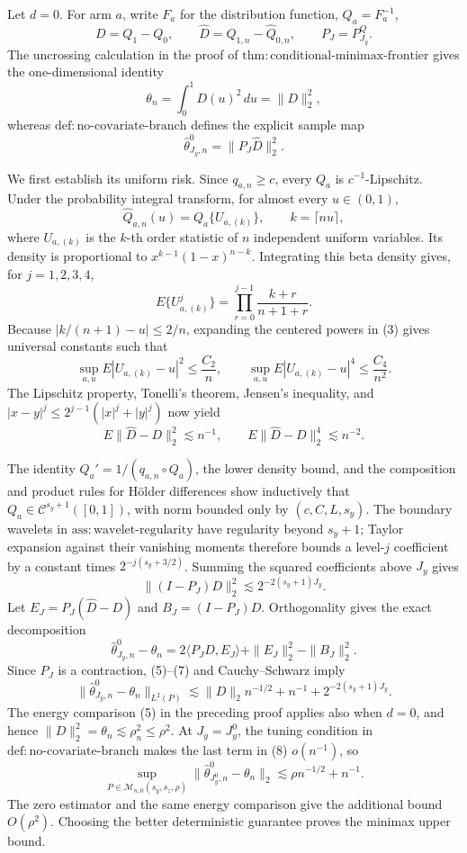 Let \(d=0\).  For arm \(a\), write \(F_a\) for the distribution function, \(Q_a=F_a^{-1}\),
\[
D=Q_1-Q_0,
\qquad
\widehat D=\widehat Q_{1,n}-\widehat Q_{0,n},
\qquad
P_J=P^Q_{J_y}.
\]
The uncrossing calculation in the proof of
\(\mathrm{thm{:}conditional\text{-}minimax\text{-}frontier}\) gives the one-dimensional identity
\[
\theta_n=\int_0^1D(u)^2\,du=\|D\|_2^2,                     \tag{1}
\]
whereas
\(\mathrm{def{:}no\text{-}covariate\text{-}branch}\) defines the explicit sample map
\[
\widehat\theta^0_{J_y,n}=\|P_J\widehat D\|_2^2.            \tag{2}
\]

We first establish its uniform risk.  Since \(q_{a,n}\ge c\), every \(Q_a\) is \(c^{-1}\)-Lipschitz.  Under the probability integral transform, for almost every \(u\in(0,1)\),
\[
\widehat Q_{a,n}(u)=Q_a\{U_{a,(k)}\},
\qquad k=\lceil nu\rceil,
\]
where \(U_{a,(k)}\) is the \(k\)-th order statistic of \(n\) independent uniform variables.  Its density is proportional to
\(x^{k-1}(1-x)^{n-k}\).  Integrating this beta density gives, for \(j=1,2,3,4\),
\[
E\{U_{a,(k)}^j\}
=\prod_{r=0}^{j-1}\frac{k+r}{n+1+r}.                       \tag{3}
\]
Because \(|k/(n+1)-u|\le2/n\), expanding the centered powers in (3) gives universal constants such that
\[
\sup_{a,u}E|U_{a,(k)}-u|^2\le\frac{C_2}{n},
\qquad
\sup_{a,u}E|U_{a,(k)}-u|^4\le\frac{C_4}{n^2}.              \tag{4}
\]
The Lipschitz property, Tonelli's theorem, Jensen's inequality, and
\(|x-y|^j\le2^{j-1}(|x|^j+|y|^j)\) now yield
\[
E\|\widehat D-D\|_2^2\lesssim n^{-1},
\qquad
E\|\widehat D-D\|_2^4\lesssim n^{-2}.                    \tag{5}
\]

The identity \(Q_a'=1/(q_{a,n}\circ Q_a)\), the lower density bound, and the composition and product rules for H\"older differences show inductively that
\(Q_a\in\mathcal C^{s_y+1}([0,1])\), with norm bounded only by \((c,C,L,s_y)\).  The boundary wavelets in
\(\mathrm{ass{:}wavelet\text{-}regularity}\) have regularity beyond \(s_y+1\); Taylor expansion against their vanishing moments therefore bounds a level-\(j\) coefficient by a constant times
\(2^{-j(s_y+3/2)}\).  Summing the squared coefficients above \(J_y\) gives
\[
\|(I-P_J)D\|_2^2\lesssim2^{-2(s_y+1)J_y}.                  \tag{6}
\]
Let \(E_J=P_J(\widehat D-D)\) and \(B_J=(I-P_J)D\).  Orthogonality gives the exact decomposition
\[
\widehat\theta^0_{J_y,n}-\theta_n
=2\langle P_JD,E_J\rangle+\|E_J\|_2^2-\|B_J\|_2^2.        \tag{7}
\]
Since \(P_J\) is a contraction, (5)--(7) and Cauchy--Schwarz imply
\[
\|\widehat\theta^0_{J_y,n}-\theta_n\|_{L^2(P)}
\lesssim
\|D\|_2n^{-1/2}+n^{-1}+2^{-2(s_y+1)J_y}.                  \tag{8}
\]
The energy comparison (5) in the preceding proof applies also when \(d=0\), and hence
\(\|D\|_2^2=\theta_n\lesssim\rho_n^2\le\rho^2\).  At \(J_y=J_y^0\), the tuning condition in
\(\mathrm{def{:}no\text{-}covariate\text{-}branch}\) makes the last term in (8) \(o(n^{-1})\), so
\[
\sup_{P\in\mathcal M_{n,0}(s_y,s_z,\rho)}
\|\widehat\theta^0_{J_y^0,n}-\theta_n\|_2
\lesssim\rho n^{-1/2}+n^{-1}.                              \tag{9}
\]
The zero estimator and the same energy comparison give the additional bound \(O(\rho^2)\).  Choosing the better deterministic guarantee proves the minimax upper bound.

